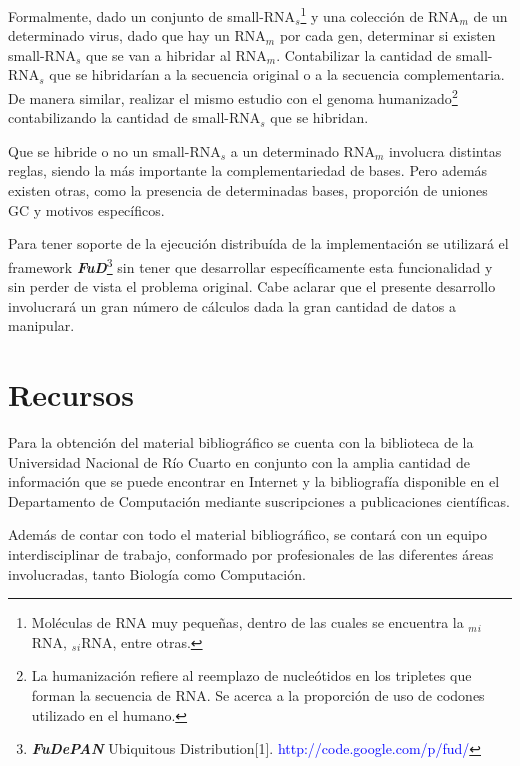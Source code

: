 \documentclass[12pt,a4paper]{article}
\begin{document}
\par Formalmente, dado un conjunto de small-RNA$_s$\footnote{Moléculas de RNA muy pequeñas, dentro de las cuales se encuentra la $_m$$_i$RNA, $_s$$_i$RNA, entre otras.} y una colección de RNA$_m$ de un determinado virus, dado que hay un RNA$_m$ por cada gen, determinar si existen small-RNA$_s$ que se van a hibridar al RNA$_m$. Contabilizar la cantidad de small-RNA$_s$ que se hibridarían a la secuencia original o a la secuencia complementaria. De manera similar, realizar el mismo estudio con el genoma humanizado\footnote{La humanización refiere al reemplazo de nucleótidos en los tripletes que forman la secuencia de RNA. Se acerca a la proporción de uso de codones utilizado en el humano.} contabilizando la cantidad de small-RNA$_s$ que se hibridan. 
\par Que se hibride o no un small-RNA$_s$ a un determinado RNA$_m$ involucra distintas reglas, siendo la más importante la complementariedad de bases. Pero además existen otras, como la presencia de determinadas bases, proporción de uniones GC y motivos específicos.

\par Para tener soporte de la ejecución distribuída de la implementación se utilizará el framework \textbf{\textit{FuD}}\footnote{\textbf{\textit{FuDePAN}} Ubiquitous Distribution[1]. \textcolor{blue}{http://code.google.com/p/fud/}} sin tener que desarrollar específicamente esta funcionalidad y sin perder de vista el problema original. Cabe aclarar que el presente desarrollo involucrará un gran número de cálculos dada la gran cantidad de datos a manipular. 

\section{Recursos}

\par Para la obtención del material bibliográfico se cuenta con la biblioteca de la Universidad Nacional de Río Cuarto en conjunto con la amplia cantidad de información que se puede encontrar en Internet y la bibliografía disponible en el Departamento de Computación mediante suscripciones a publicaciones científicas.

\par Además de contar con todo el material bibliográfico, se contará con un equipo interdisciplinar de trabajo, conformado por profesionales de las diferentes áreas involucradas, tanto Biología como Computación. 
\end{document}
